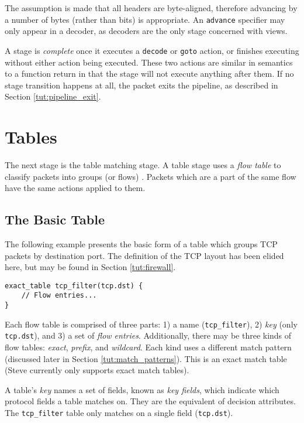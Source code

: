The assumption is made that all headers are byte-aligned, therefore advancing by
a number of bytes (rather than bits) is appropriate. An
\texttt{advance} specifier may only appear in a decoder, as decoders are the only
stage concerned with views.

A stage is \textit{complete} once it executes a \texttt{decode} or \texttt{goto} action, or
finishes executing without either action being executed. 
These two actions are similar in semantics to a function return
in that the stage will not execute anything after them.
If no stage transition happens at all,
the packet exits the pipeline, as described in Section \ref{tut:pipeline_exit}.

\section{Tables} \label{tut:table}

The next stage is the table matching stage. 
A table stage uses a \emph{flow table} to classify packets into
groups (or flows) \cite{openflow_spec}. 
Packets which are a part of the same flow have the same actions applied to them.

\subsection{The Basic Table} \label{tut:basic_table}

The following example presents the basic form of a table which
groups TCP packets by destination port. The definition of the TCP
layout has been elided here, but may be found in Section \ref{tut:firewall}.

\begin{codepage}
\begin{lstlisting}
exact_table tcp_filter(tcp.dst) {
	// Flow entries...
}
\end{lstlisting}
\end{codepage}

Each flow table is comprised of three parts: 
1) a name (\texttt{tcp\_filter}), 
2) \textit{key} (only \texttt{tcp.dst}), and
3) a set of \textit{flow entries}. 
Additionally, there may be three kinds of flow tables: 
\textit{exact}, \textit{prefix}, and \textit{wildcard}. 
Each kind uses a different match pattern (discussed later in Section 
\ref{tut:match_patterns}).
This is an exact match table (Steve currently only supports exact
match tables).

A table's \textit{key} names a set of fields, known as
\textit{key fields}, which indicate which protocol fields a table matches on.
They are the equivalent of decision attributes. 
The \texttt{tcp\_filter} table only matches on a single field (\texttt{tcp.dst}).

